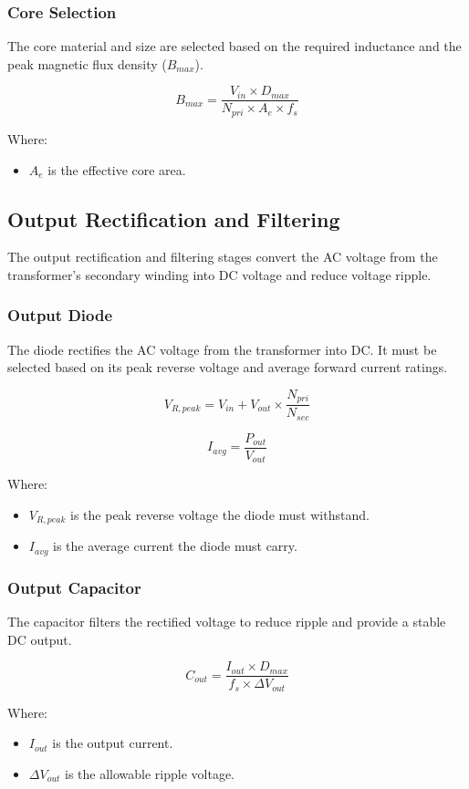 \documentclass{article}
\begin{document}
\subsubsection{Core Selection}
The core material and size are selected based on the required inductance and the peak magnetic flux density ($B_{max}$).

\[
B_{max} = \frac{V_{in} \times D_{max}}{N_{pri} \times A_e \times f_s}
\]

Where:
\begin{itemize}
    \item $A_e$ is the effective core area.
\end{itemize}

\subsection{Output Rectification and Filtering}
The output rectification and filtering stages convert the AC voltage from the transformer's secondary winding into DC voltage and reduce voltage ripple.

\subsubsection{Output Diode}
The diode rectifies the AC voltage from the transformer into DC. It must be selected based on its peak reverse voltage and average forward current ratings.

\[
V_{R, peak} = V_{in} + V_{out} \times \frac{N_{pri}}{N_{sec}}
\]

\[
I_{avg} = \frac{P_{out}}{V_{out}}
\]

Where:
\begin{itemize}
    \item $V_{R, peak}$ is the peak reverse voltage the diode must withstand.
    \item $I_{avg}$ is the average current the diode must carry.
\end{itemize}

\subsubsection{Output Capacitor}
The capacitor filters the rectified voltage to reduce ripple and provide a stable DC output.

\[
C_{out} = \frac{I_{out} \times D_{max}}{f_s \times \Delta V_{out}}
\]

Where:
\begin{itemize}
    \item $I_{out}$ is the output current.
    \item $\Delta V_{out}$ is the allowable ripple voltage.
\end{itemize}
\end{document}
